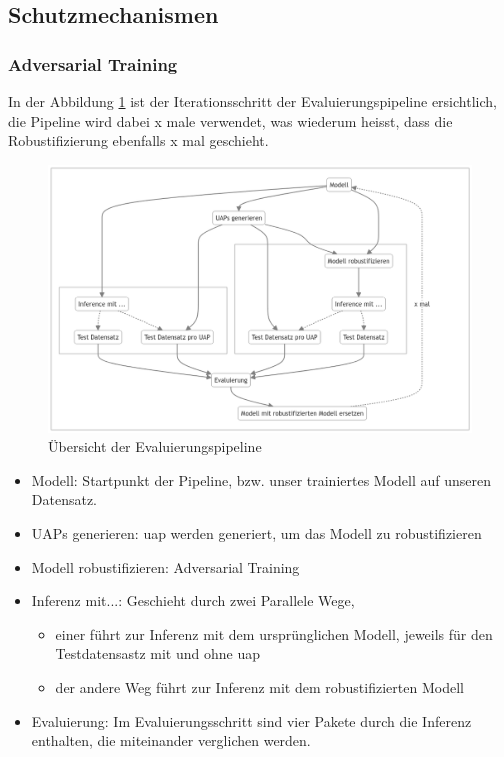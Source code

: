 \subsection{Schutzmechanismen}


\subsubsection{Adversarial Training}

In der Abbildung \ref{fig:Evaluierungspipeline} ist der Iterationsschritt der Evaluierungspipeline ersichtlich, die Pipeline wird dabei x male verwendet, was wiederum heisst, dass die Robustifizierung ebenfalls x mal geschieht. 

\begin{figure}[H]
    \centering
    \includegraphics[width=\linewidth]{01-images/04-methodik/pipeline-robustifizierung.png}
    \caption{Übersicht der Evaluierungspipeline}
    \label{fig:Evaluierungspipeline}
\end{figure}

\begin{itemize}
    \item Modell: Startpunkt der Pipeline, bzw. unser trainiertes Modell auf unseren Datensatz. 
    \item UAPs generieren: \acrlong{uap} werden generiert, um das Modell zu robustifizieren
    \item Modell robustifizieren: Adversarial Training
    \item Inferenz mit...: Geschieht durch zwei Parallele Wege, 
        \begin{itemize}
            \item einer führt zur Inferenz mit dem ursprünglichen Modell, jeweils für den Testdatensastz mit und ohne \acrshort{uap}
            \item der andere Weg führt zur Inferenz mit dem robustifizierten Modell
        \end{itemize}
    \item Evaluierung: Im Evaluierungsschritt sind vier Pakete durch die Inferenz enthalten, die miteinander verglichen werden. 
\end{itemize}